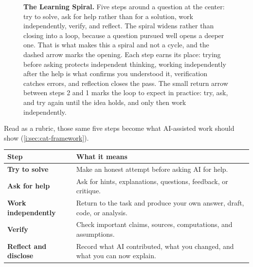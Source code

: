 \documentclass{SIAMbook2023}
\begin{document}
\begin{figure}[ht]
\caption{\textbf{The Learning Spiral.} Five steps around a question at the center: try to solve, ask for help rather than for a solution, work independently, verify, and reflect. The spiral widens rather than closing into a loop, because a question pursued well opens a deeper one. That is what makes this a spiral and not a cycle, and the dashed arrow marks the opening. Each step earns its place: trying before asking protects independent thinking, working independently after the help is what confirms you understood it, verification catches errors, and reflection closes the pass. The small return arrow between steps 2 and 1 marks the loop to expect in practice: try, ask, and try again until the idea holds, and only then work independently.}
\label{fig:learning-spiral}
\end{figure}

Read as a rubric, those same five steps become what AI-assisted work should show (\cref{i:sec:cat-framework}).

\begin{center}
\begin{tabular}{>{\bfseries}p{}p{}}
\toprule
Step & What it means \\
\midrule
Try to solve & Make an honest attempt before asking AI for help. \\
Ask for help & Ask for hints, explanations, questions, feedback, or critique. \\
Work independently & Return to the task and produce your own answer, draft, code, or analysis. \\
Verify & Check important claims, sources, computations, and assumptions. \\
Reflect and disclose & Record what AI contributed, what you changed, and what you can now explain. \\
\bottomrule
\end{tabular}
\end{center}
\end{document}
